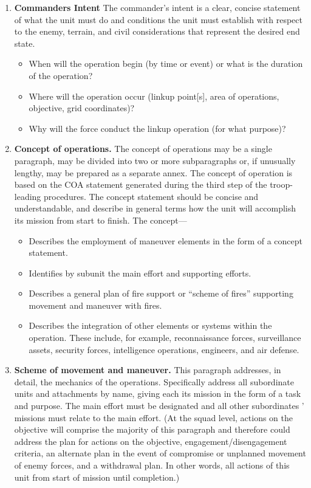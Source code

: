 \documentclass[letterpaper,tgtermes,9pt,microtype,colorlinks=true,urlcolor=blue,DIV=calc,pagesize]{scrartcl}
\begin{document}
\begin{enumerate}
\item \textbf{Commanders Intent}
\label{sec:orge4988c8}
The commander’s intent is a clear, concise statement of what the unit must do and conditions the unit must establish with respect to the enemy, terrain, and civil considerations that represent the desired end state.
\begin{itemize}
\item When will the operation begin (by time or event) or what is the duration of the operation?
\item Where will the operation occur (linkup point[s], area of operations, objective, grid coordinates)?
\item Why will the force conduct the linkup operation (for what purpose)?
\end{itemize}
\item \textbf{Concept of operations.}
\label{sec:orge1df4cd}
The concept of operations may be a single paragraph, may be divided into two or more subparagraphs or, if unusually lengthy, may be prepared as a separate annex. The concept of operation is based on the COA statement generated during the third step of the troop-leading procedures. The concept statement should be concise and understandable, and describe in general terms how the unit will accomplish its mission from start to finish.
The concept—
\begin{itemize}
\item Describes the employment of maneuver elements in the form of a concept statement.
\item Identifies by subunit the main effort and supporting efforts.
\item Describes a general plan of fire support or “scheme of fires” supporting movement and maneuver with fires.
\item Describes the integration of other elements or systems within the operation. These include, for example, reconnaissance forces, surveillance assets, security forces, intelligence operations, engineers, and air defense.
\end{itemize}
\item \textbf{Scheme of movement and maneuver.}
\label{sec:orgf3bab83}
This paragraph addresses, in detail, the mechanics of the operations. Specifically address all subordinate units and attachments by name, giving each its mission in the form of a task and purpose. The main effort must be designated and all other subordinates ’ missions must relate to the main effort. (At the squad level, actions on the objective will comprise the majority of this paragraph and therefore could address the plan for actions on the objective, engagement/disengagement criteria, an alternate plan in the event of compromise or unplanned movement of enemy forces, and a withdrawal plan. In other words, all actions of this unit from start of mission until completion.)

\end{enumerate}
\end{document}
